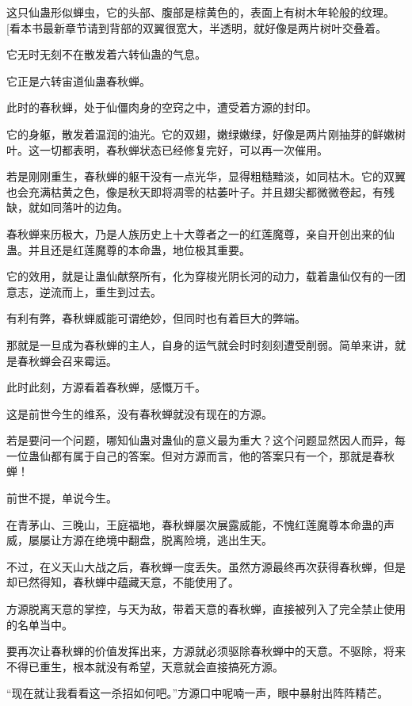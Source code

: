 
\begin{this_body}

这只仙蛊形似蝉虫，它的头部、腹部是棕黄色的，表面上有树木年轮般的纹理。[看本书最新章节请到背部的双翼很宽大，半透明，就好像是两片树叶交叠着。

它无时无刻不在散发着六转仙蛊的气息。

它正是六转宙道仙蛊春秋蝉。

此时的春秋蝉，处于仙僵肉身的空窍之中，遭受着方源的封印。

它的身躯，散发着温润的油光。它的双翅，嫩绿嫩绿，好像是两片刚抽芽的鲜嫩树叶。这一切都表明，春秋蝉状态已经修复完好，可以再一次催用。

若是刚刚重生，春秋蝉的躯干没有一点光华，显得粗糙黯淡，如同枯木。它的双翼也会充满枯黄之色，像是秋天即将凋零的枯萎叶子。并且翅尖都微微卷起，有残缺，就如同落叶的边角。

春秋蝉来历极大，乃是人族历史上十大尊者之一的红莲魔尊，亲自开创出来的仙蛊。并且还是红莲魔尊的本命蛊，地位极其重要。

它的效用，就是让蛊仙献祭所有，化为穿梭光阴长河的动力，载着蛊仙仅有的一团意志，逆流而上，重生到过去。

有利有弊，春秋蝉威能可谓绝妙，但同时也有着巨大的弊端。

那就是一旦成为春秋蝉的主人，自身的运气就会时时刻刻遭受削弱。简单来讲，就是春秋蝉会召来霉运。

此时此刻，方源看着春秋蝉，感慨万千。

这是前世今生的维系，没有春秋蝉就没有现在的方源。

若是要问一个问题，哪知仙蛊对蛊仙的意义最为重大？这个问题显然因人而异，每一位蛊仙都有属于自己的答案。但对方源而言，他的答案只有一个，那就是春秋蝉！

前世不提，单说今生。

在青茅山、三晚山，王庭福地，春秋蝉屡次展露威能，不愧红莲魔尊本命蛊的声威，屡屡让方源在绝境中翻盘，脱离险境，逃出生天。

不过，在义天山大战之后，春秋蝉一度丢失。虽然方源最终再次获得春秋蝉，但是却已然得知，春秋蝉中蕴藏天意，不能使用了。

方源脱离天意的掌控，与天为敌，带着天意的春秋蝉，直接被列入了完全禁止使用的名单当中。

要再次让春秋蝉的价值发挥出来，方源就必须驱除春秋蝉中的天意。不驱除，将来不得已重生，根本就没有希望，天意就会直接搞死方源。

“现在就让我看看这一杀招如何吧。”方源口中呢喃一声，眼中暴射出阵阵精芒。


\end{this_body}
